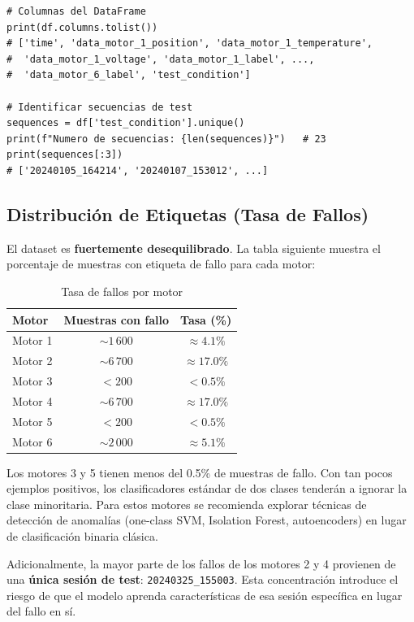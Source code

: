 \documentclass[12pt,a4paper]{article}
\begin{document}
\begin{lstlisting}[caption={Inspección de columnas y tipos}, label={lst:cols}]
# Columnas del DataFrame
print(df.columns.tolist())
# ['time', 'data_motor_1_position', 'data_motor_1_temperature',
#  'data_motor_1_voltage', 'data_motor_1_label', ...,
#  'data_motor_6_label', 'test_condition']

# Identificar secuencias de test
sequences = df['test_condition'].unique()
print(f"Numero de secuencias: {len(sequences)}")   # 23
print(sequences[:3])
# ['20240105_164214', '20240107_153012', ...]
\end{lstlisting}

\subsection{Distribución de Etiquetas (Tasa de Fallos)}

El dataset es \textbf{fuertemente desequilibrado}. La tabla siguiente muestra
el porcentaje de muestras con etiqueta de fallo para cada motor:

\begin{table}[H]
\centering
\caption{Tasa de fallos por motor}
\begin{tabular}{@{}lcc@{}}
\toprule
\textbf{Motor} & \textbf{Muestras con fallo} & \textbf{Tasa (\%)}\\
\midrule
Motor 1 & $\sim 1\,600$  & $\approx 4.1\%$\\
Motor 2 & $\sim 6\,700$  & $\approx 17.0\%$\\
Motor 3 & $< 200$        & $< 0.5\%$\\
Motor 4 & $\sim 6\,700$  & $\approx 17.0\%$\\
Motor 5 & $< 200$        & $< 0.5\%$\\
Motor 6 & $\sim 2\,000$  & $\approx 5.1\%$\\
\bottomrule
\end{tabular}
\end{table}

\begin{warningbox}
Los motores 3 y 5 tienen menos del 0.5\% de muestras de fallo. Con tan pocos ejemplos
positivos, los clasificadores estándar de dos clases tenderán a ignorar la clase
minoritaria. Para estos motores se recomienda explorar técnicas de detección de
anomalías (one-class SVM, Isolation Forest, autoencoders) en lugar de clasificación
binaria clásica.

Adicionalmente, la mayor parte de los fallos de los motores 2 y 4 provienen de una
\textbf{única sesión de test}: \texttt{20240325\_155003}. Esta concentración introduce
el riesgo de que el modelo aprenda características de esa sesión específica en lugar
del fallo en sí.
\end{warningbox}
\end{document}
